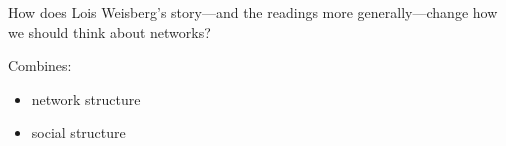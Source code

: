\documentclass[aspectratio=169]{beamer}
\begin{document}
\begin{frame}

How does Lois Weisberg's story---and the readings more generally---change how we should think about networks?

\pause 

Combines:
\begin{itemize}
\item network structure
\item social structure 
\end{itemize}


\end{frame}
\end{document}
